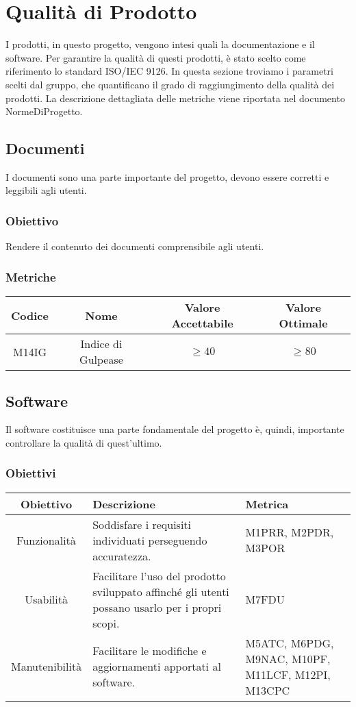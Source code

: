\section{Qualità di Prodotto}
I prodotti, in questo progetto, vengono intesi quali la documentazione e il software. Per garantire la qualità di questi prodotti, è stato scelto come riferimento lo standard ISO/IEC 9126. In questa sezione troviamo i parametri scelti dal gruppo, che quantificano il grado di raggiungimento della qualità dei prodotti. La descrizione dettagliata delle metriche viene riportata nel documento NormeDiProgetto.

\subsection{Documenti}
I documenti sono una parte importante del progetto, devono essere corretti e leggibili agli utenti.
\subsubsection{Obiettivo}
Rendere il contenuto dei documenti comprensibile agli utenti.
\subsubsection{Metriche}
\begin{center}
\renewcommand{\arraystretch}{1.8}
\begin{tabular}{ |c|c|c|c|}
	\hline
	\textbf{Codice} & \textbf{Nome} & \textbf{Valore Accettabile} & \textbf{Valore Ottimale} \\
	\hline
	M14IG & Indice di Gulpease &  $\geq 40 $ & $\geq 80 $ \\
	\hline
\end{tabular}
\end{center}

\subsection{Software}
Il software costituisce una parte fondamentale del progetto è, quindi, importante controllare la qualità di quest'ultimo.

\subsubsection{Obiettivi}
\begin{center}
	\renewcommand{\arraystretch}{1.8}
	\begin{tabular}{ |c|m{18em}|m{8em}|}
		\hline
		\textbf{Obiettivo} & \textbf{Descrizione} & \textbf{Metrica} \\
		\hline
		Funzionalità & Soddisfare i requisiti individuati perseguendo accuratezza. & M1PRR, M2PDR, M3POR \\
		\hline
		Usabilità & Facilitare l'uso del prodotto sviluppato affinché gli utenti possano usarlo per i propri scopi. & M7FDU \\
		\hline
		Manutenibilità & Facilitare le modifiche e aggiornamenti apportati al software. & M5ATC, M6PDG, M9NAC, M10PF, M11LCF, M12PI, M13CPC \\
		\hline
	\end{tabular}
\end{center}

